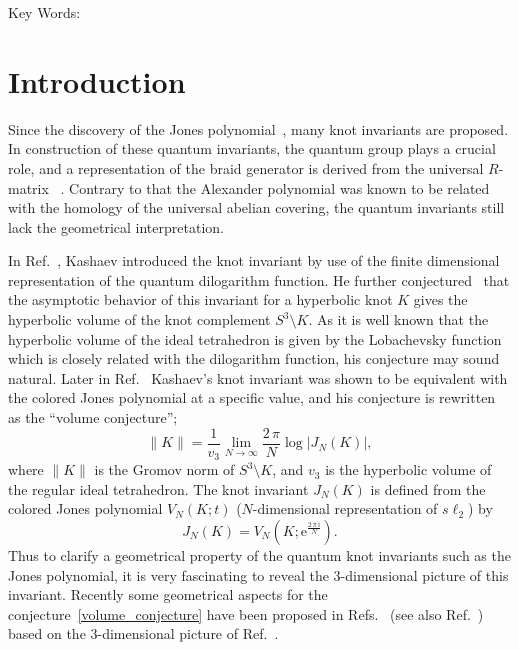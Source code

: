 \documentclass[12pt]{article}
\numberwithin{equation}{section}
\renewcommand{\thefootnote}{\fnsymbol{footnote}}
\begin{document}
\vfill
\noindent
\textsf{Key Words:}


\newpage

\renewcommand{\thefootnote}{\arabic{footnote}}


\section{Introduction}

Since
the discovery of  the Jones polynomial~\cite{Jones85},
many knot invariants are proposed.
In  construction of these  quantum invariants, the quantum group
plays a crucial role,
and a representation of the
braid generator is derived  from  the
universal $R$-matrix ~\cite{Turae88}.
Contrary to
that the Alexander polynomial was known to be related with the
homology of the universal abelian covering,
the quantum invariants  still lack
the geometrical interpretation.


In Ref.~, Kashaev introduced 
the knot invariant   by
use of the finite dimensional representation of  the quantum
dilogarithm function.
He further  conjectured~\cite{Kasha96b} that the asymptotic behavior of
this invariant for a hyperbolic   knot $K$ gives  the hyperbolic volume of
the knot complement $S^3 \setminus K$.
As it is well known that the hyperbolic volume of the ideal
tetrahedron is given by the Lobachevsky function~\cite{WPThurs80Lecture,JMiln82a} which
is closely related with the dilogarithm function,
his  conjecture
may sound  natural.
Later in Ref.~
Kashaev's  knot invariant was shown to be equivalent with the colored Jones
polynomial at  a specific value, and his
conjecture is rewritten as the ``volume conjecture'';
\begin{equation}
  \label{volume_conjecture}
  \| K \|
  =
  \frac{1}{v_3}
  \lim_{N\to \infty}
  \frac{2 \, \pi}{N} \log | J_N(K) | ,
\end{equation}
where  $\| K \|$ is the Gromov norm of $S^3 \setminus K$, and
$v_3$ is the hyperbolic volume of the regular ideal tetrahedron.
The knot invariant  $J_N(K)$ is defined from the colored Jones
polynomial
$V_N(K;t)$
($N$-dimensional representation of $s\ell_2$)
by
\begin{equation*}
  J_N(K) 
  =
  V_N(K ; \mathrm{e}^{\frac{2 \, \pi \, \mathrm{i}}{N}}) .
\end{equation*}
Thus to clarify  a geometrical property of the quantum knot invariants
such as the Jones polynomial,
it is very fascinating to  reveal the 3-dimensional picture of this
invariant.
Recently some geometrical aspects for the
conjecture~\eqref{volume_conjecture}
have been proposed  in
Refs.~
(see also Ref.~\cite{HMuraka00c}) based on the 3-dimensional picture
of Ref.~.
\end{document}
